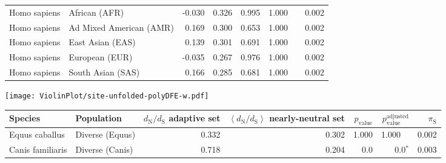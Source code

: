 \begin{center}
\begin{adjustbox}{width = 1\textwidth}
\begin{tabular}{|l|l|r|r|r|r|r|}
        Homo sapiens &                   African (AFR) &                                             -0.030 &                                              0.326 &                0.995 &                                  1.000~~ &              0.002 \\
        Homo sapiens &         Ad Mixed American (AMR) &                                              0.169 &                                              0.300 &                0.653 &                                  1.000~~ &              0.002 \\
        Homo sapiens &                East Asian (EAS) &                                              0.139 &                                              0.301 &                0.691 &                                  1.000~~ &              0.002 \\
        Homo sapiens &                  European (EUR) &                                             -0.035 &                                              0.267 &                0.976 &                                  1.000~~ &              0.002 \\
        Homo sapiens &               South Asian (SAS) &                                              0.166 &                                              0.285 &                0.681 &                                  1.000~~ &              0.002 \\
\bottomrule
\end{tabular}
\end{adjustbox}
\newpage
\texttt{[image: ViolinPlot/site-unfolded-polyDFE-w.pdf]} 
\begin{adjustbox}{width = 1\textwidth}
\begin{tabular}{|l|l|r|r|r|r|r|}
\toprule
             Species &                      Population & \specialcell{$d_{\mathrm{N}} / d_{\mathrm{S}}$ \\ adaptive set} & \specialcell{$\left< d_{\mathrm{N}} / d_{\mathrm{S}} \right>$ \\ nearly-neutral set} & $p_{\mathrm{value}}$ & $p_{\mathrm{value}}^{\mathrm{adjusted}}$ & $\pi_{\textrm{S}}$ \\
\midrule
      Equus caballus &                 Diverse (Equus) &                                              0.332 &                                              0.302 &                1.000 &                                  1.000~~ &              0.002 \\
    Canis familiaris &                 Diverse (Canis) &                                              0.718 &                                              0.204 &                  0.0 &                             0.0$\bm{^*}$ &              0.003 \\

\end{tabular}
\end{adjustbox}
\end{center}

